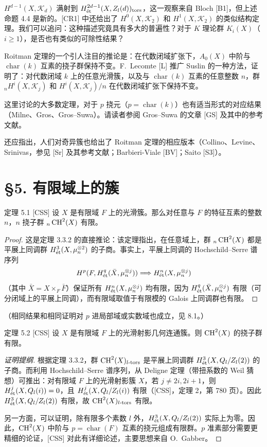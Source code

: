 $H^{d-1}(X,\mathcal K_d)$ 满射到 $H^{2d-1}_{\mathrm{\acute et}}(X,Z_l(d))_{\mathrm{tors}}$，这一观察来自 Bloch [B1]，但上述命题 4.4 是新的。[CR1] 中还给出了
$H^0(X,\mathcal K_2)$ 和 $H^1(X,\mathcal K_2)$ 的类似结构定理。我们可以追问：这种描述究竟具有多大的普遍性？对于 $K$ 理论群 $K_i(X)$（$i\ge1$），是否也有类似的可除性结果？

Roitman 定理的一个引人注目的推论是：在代数闭域扩张下，$A_0(X)$ 中阶与 $\operatorname{char}(k)$ 互素的挠子群保持不变。F.~Lecomte [L] 推广 Suslin 的一种方法，证明了：对代数闭域 $k$ 上的任意光滑簇，以及与 $\operatorname{char}(k)$ 互素的任意整数 $n$，群 ${}_nH^i(X,\mathcal K_j)$ 和 $H^i(X,\mathcal K_j)/n$ 在代数闭域扩张下保持不变。

这里讨论的大多数定理，对于 $p$ 挠元（$p=\operatorname{char}(k)$）也有适当形式的对应结果（Milne、Gros、Gros--Suwa）。请读者参阅 Gros--Suwa 的文章 [GS] 及其中的参考文献。

还应指出，人们对奇异簇也给出了 Roitman 定理的相应版本（Collino、Levine、Srinivas，参见 [Sr] 及其参考文献；Barbieri-Viale [BV]；Saito [S3]）。

\section*{§5. 有限域上的簇}
\begin{statement}{定理 5.1 [CSS]}
设 $X$ 是有限域 $F$ 上的光滑簇。那么对任意与 $F$ 的特征互素的整数 $n$，$n$ 挠子群 ${}_n\operatorname{CH}^2(X)$ 有限。
\end{statement}
\begin{proof}
这是定理 3.3.2 的直接推论：该定理指出，在任意域上，群 ${}_n\operatorname{CH}^2(X)$ 都是平展上同调群 $H^3_{\mathrm{\acute et}}(X,\mu_n^{\otimes2})$ 的子商。事实上，平展上同调的 Hochschild--Serre 谱序列
\[
H^p(F,H^q_{\mathrm{\acute et}}(\bar X,\mu_n^{\otimes j}))\Longrightarrow H^n_{\mathrm{\acute et}}(X,\mu_n^{\otimes j})
\]
（其中 $\bar X=X\times_F\bar F$）保证所有 $H^n_{\mathrm{\acute et}}(X,\mu_n^{\otimes j})$ 均有限，因为 $H^q_{\mathrm{\acute et}}(\bar X,\mu_n^{\otimes j})$ 有限（可分闭域上的平展上同调），而有限域取值于有限模的 Galois 上同调群也有限。
\end{proof}
（相同结果和相同证明对 $p$ 进局部域或实数域也成立，见 8.1。）

\begin{statement}{定理 5.2 [CSS]}
设 $X$ 是有限域 $F$ 上的光滑射影几何连通簇。则 $\operatorname{CH}^2(X)$ 的挠子群有限。
\end{statement}
\begin{proof}[证明提纲]
根据定理 3.3.2，群 $\operatorname{CH}^2(X)_{l\text{-}\mathrm{tors}}$ 是平展上同调群 $H^3_{\mathrm{\acute et}}(X,Q_l/Z_l(2))$ 的子商。而利用 Hochschild--Serre 谱序列，从 Deligne 定理（带扭系数的 Weil 猜想）可推出：对有限域 $F$ 上的光滑射影簇 $X$，若 $j\ne2i,2i+1$，则 $H^j_{\mathrm{\acute et}}(X,Q_l(i))=0$，且 $H^j_{\mathrm{\acute et}}(X,Q_l/Z_l(i))$ 有限（[CSS]，定理 2，第 780 页）。因此 $H^3_{\mathrm{\acute et}}(X,Q_l/Z_l(2))$ 有限，故 $\operatorname{CH}^2(X)_{l\text{-}\mathrm{tors}}$ 有限。

另一方面，可以证明，除有限多个素数 $l$ 外，$H^3_{\mathrm{\acute et}}(X,Q_l/Z_l(2))$ 实际上为零。因此，$\operatorname{CH}^2(X)$ 中阶与 $p=\operatorname{char}(F)$ 互素的挠元组成有限群。$p$ 准素部分需要更精细的论证，[CSS] 对此有详细论述，主要思想来自 O.~Gabber。
\end{proof}
